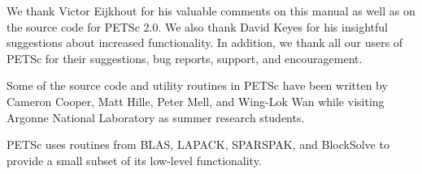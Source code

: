 

\medskip \medskip 
We thank Victor Eijkhout for his valuable comments on this
manual as well as on the source code for PETSc 2.0.  We also thank David
Keyes for his insightful suggestions about increased functionality.
In addition, we thank all our users  of PETSc for
their suggestions, bug reports, support, and encouragement.

\vspace{.3in}
Some of the source code and utility routines in PETSc have been
written by Cameron Cooper, Matt Hille, Peter Mell, and Wing-Lok Wan
while visiting Argonne National Laboratory as summer research
students.

\vspace{.3in}
PETSc uses routines from BLAS, LAPACK, SPARSPAK, and BlockSolve to
provide a small subset of its low-level functionality.
